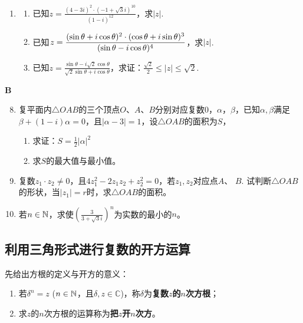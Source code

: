 \begin{enumerate}
\begin{multicols}{2}
\begin{enumerate}[(1)]
        \item $\frac{(\sqrt{3}+i)^5}{-1+\sqrt{3}i}$
        \item $\left(\frac{2+2i}{1-\sqrt{3}i}\right)^3$
    \end{enumerate}
\end{multicols}
    \item \begin{enumerate}[(1)]
        \item 已知$z=\frac{(4-3i)^2\cdot (-1+\sqrt{3}i)^{10}}{(1-i)^{12}}$，求$|z|$.
        \item 已知$z=\dfrac{(\sin\theta+i\cos\theta)^2\cdot (\cos\theta+i\sin\theta)^3}{(\sin\theta-i\cos\theta)^4}$，求$|z|$.
        \item 已知$z=\frac{\sin\theta-i\sqrt{2}\cos\theta}{\sqrt{2}\sin\theta+i\cos\theta}$，求证：$\frac{\sqrt{2}}{2}\le |z|\le \sqrt{2}$.
    \end{enumerate}
\end{enumerate}

\begin{center}
    \bfseries B
    \end{center}
\begin{enumerate}\setcounter{enumi}{7}
    \item 复平面内$\triangle OAB$的三个顶点$O$、$A$、$B$分别对应复数0，$\alpha$，$\beta$，已知$\alpha,\beta$满足$\beta+(1-i)\alpha=0$，且$|\alpha-3|=1$，设$\triangle OAB$的面积为$S$，
\begin{enumerate}[(1)]
    \item 求证：$S=\frac{1}{2}|\alpha|^2$
    \item 求$S$的最大值与最小值。
\end{enumerate}

    \item 复数$z_1\cdot z_2\ne 0$，且$4z^2_1-2z_1z_2+z_2^2=0$，若$z_1,z_2$对应点$A$、
    $B$. 试判断$\triangle OAB$的形状，当$|z_1|=r$时，求$\triangle OAB$的面积。
    \item 若$n\in\mathbb{N}$，求使$\left(\frac{3}{3+\sqrt{3}i}\right)^n$为实数的最小的$n$。
\end{enumerate}

\subsection{利用三角形式进行复数的开方运算}
先给出方根的定义与开方的意义：
\begin{enumerate}[(1)]
\item 若$\delta^n=z$ ($n\in\mathbb{N}$，且$\delta,z\in\mathbb{C}$)，称$\delta$为\textbf{复数$z$的$n$次方根}；
\item 求$z$的$n$次方根的运算称为\textbf{把$z$开$n$次方}。
\end{enumerate}

